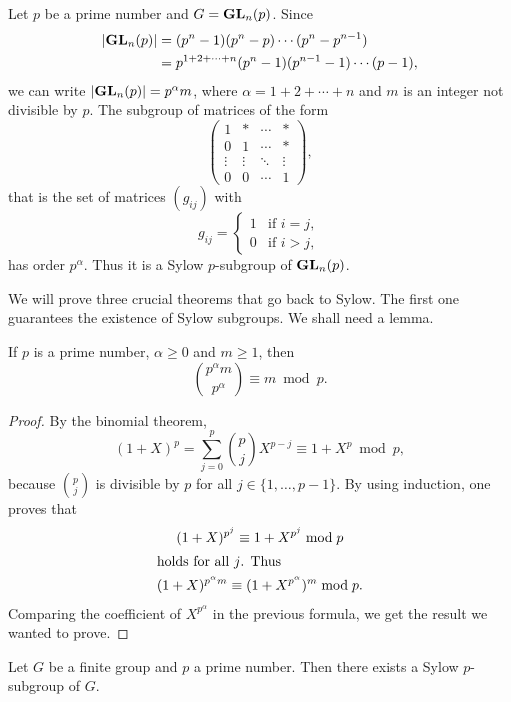 \begin{example}
Let $p$ be a prime number and 
$G=\mathbf{GL}_n(p)$. Since 
\begin{align*}
|\mathbf{GL}_n(p)|&=(p^n-1)(p^n-p)\cdots (p^n-p^{n-1})\\
&=p^{1+2+\cdots+n}(p^n-1)(p^{n-1}-1)\cdots (p-1),
\end{align*}
we can write $|\mathbf{GL}_n(p)|=p^\alpha m$, where $\alpha=1+2+\cdots+n$ and $m$
is an integer not divisible by $p$. 
The subgroup of matrices of the form 
\[
\begin{pmatrix}
1 & * & \cdots & *\\
0 & 1 & \cdots & *\\
\vdots & \vdots & \ddots & \vdots\\
0 & 0 & \cdots & 1
\end{pmatrix},
\]
that is the set of matrices $(g_{ij})$ with 
\[
g_{ij}=\begin{cases}
1 & \text{if $i=j$},\\
0 & \text{if $i>j$},
\end{cases}
\]
has order $p^\alpha$. Thus it is a Sylow $p$-subgroup of 
$\mathbf{GL}_n(p)$.
\end{example}

We will prove three crucial theorems that go back to Sylow. 
The first one guarantees the existence of Sylow subgroups. 
We shall need a lemma. 

\begin{lemma}
    If $p$ is a prime number, 
    $\alpha\geq0$ and $m\geq 1$, then 
    \[
        \binom{p^\alpha m}{p^\alpha}\equiv m\bmod p.
    \]
\end{lemma}

\begin{proof}
    By the binomial theorem,
        \[
        (1+X)^p=\sum_{j=0}^p\binom{p}{j}X^{p-j}\equiv 1+X^p\bmod p,
        \]
    because $\binom{p}{j}$ is divisible by $p$ for all
    $j\in\{1,\dots,p-1\}$.
    By using induction, one proves that 
        \begin{gather*}
        (1+X)^{p^j}\equiv 1+X^{p^j}\bmod p      \\
        \shortintertext{holds for all $j$. Thus}
        (1+X)^{p^\alpha m}\equiv (1+X^{p^\alpha})^m\bmod p.
        \end{gather*}
Comparing the coefficient of $X^{p^\alpha}$ in the previous
formula, we get the result we wanted to prove.
\end{proof}

\begin{theorem}
\label{thm:Sylow1}
Let $G$ be a finite group and 
$p$ a prime number. Then there exists a Sylow $p$-subgroup of $G$. 
\end{theorem}

